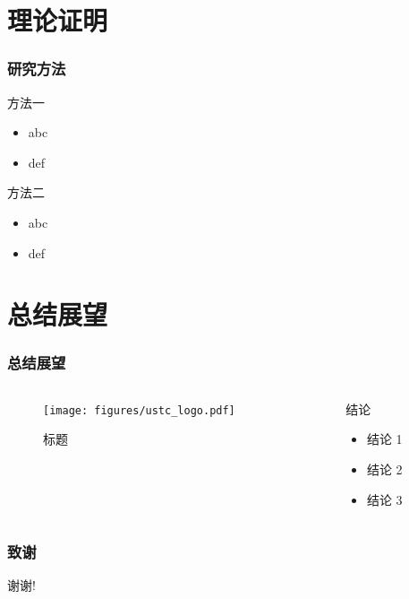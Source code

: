 \documentclass[aspectratio=169]{ctexbeamer}
\begin{document}
\section{理论证明}

\begin{frame}
  \frametitle{研究方法}
  \begin{block}{方法一}
    \begin{itemize}
      \item abc
      \item def
    \end{itemize}
  \end{block}
  \pause
  \begin{block}{方法二}
    \begin{itemize}
      \item abc
      \item def
    \end{itemize}
  \end{block}
\end{frame}


\section{总结展望}

\begin{frame}
  \frametitle{总结展望}
  \begin{columns}
    \begin{column}{0.50\textwidth}
      \begin{figure}
        \texttt{[image: figures/ustc\_logo.pdf]}
        \caption{标题}
      \end{figure}
    \end{column}
    \begin{column}{0.50\textwidth}
      \begin{block}{结论}
        \begin{itemize}
          \item 结论 1
          \item 结论 2
          \item 结论 3
        \end{itemize}
      \end{block}
    \end{column}
  \end{columns}
\end{frame}

\begin{frame}
  \frametitle{致谢}
  \centerline{\Large 谢谢!}
\end{frame}
\end{document}
